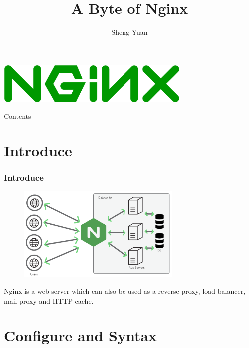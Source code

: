 \documentclass{beamer}
\title{A Byte of Nginx}
\author{Sheng Yuan}
\date{}
\begin{document}
    
\begin{frame}
	\centering\includegraphics[width=0.7\textwidth]{nginx.png}
    \titlepage
\end{frame}

\begin{frame}{Contents}
    \tableofcontents
\end{frame}

\section{Introduce}
\begin{frame}
\frametitle{Introduce}
	\begin{figure}
		\centering\includegraphics[width=0.7\textwidth]{nginx_architecture.png}
	\end{figure}

Nginx is a web server which can also be used as a reverse proxy, load balancer, mail proxy and HTTP cache\cite{nedelcu2015nginx}.
\end{frame}


\section{Configure and Syntax}
\end{document}
